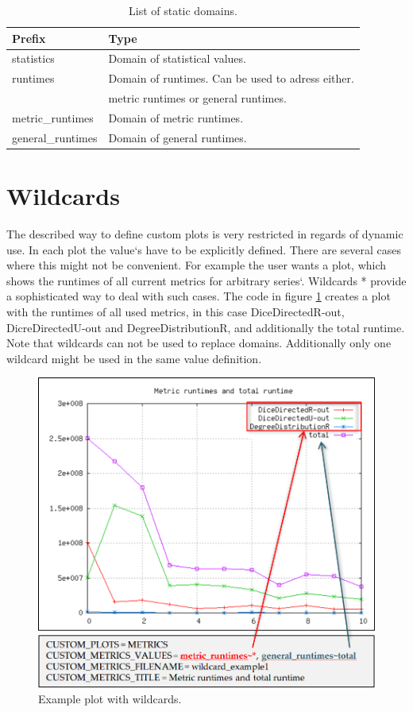 \begin{table} [h]
\centering
\begin{tabular}[h]{|l|l|}\hline
	\textbf{Prefix} & \textbf{Type}\\
	\hline
	statistics & Domain of statistical values.\\
	\hline
	runtimes & Domain of runtimes. Can be used to adress either.\\
	& metric runtimes or general runtimes.\\
	\hline
	metric{\_}runtimes & Domain of metric runtimes.\\
	\hline
	general{\_}runtimes & Domain of general runtimes.\\
	\hline
\end{tabular}
\caption{List of static domains.}
\label{tab:domains}
\end{table}

\section{Wildcards}
The described way to define custom plots is very restricted in regards of dynamic use. In each plot the value‘s have to be explicitly defined. There are several cases where this might not be convenient. For example the user wants a plot, which shows the runtimes of all current metrics for arbitrary series‘. Wildcards * provide a sophisticated way to deal with such cases. The code in figure \ref{fig:36} creates a plot with the runtimes of all used metrics, in this case DiceDirectedR-out, DicreDirectedU-out and DegreeDistributionR, and additionally the total runtime. Note that wildcards can not be used to replace domains. Additionally only one wildcard might be used in the same value definition.

\begin{figure} [h]
\centering
\includegraphics [scale=0.5] {images/36}
\caption{Example plot with wildcards.}
\label{fig:36}
\end{figure}

